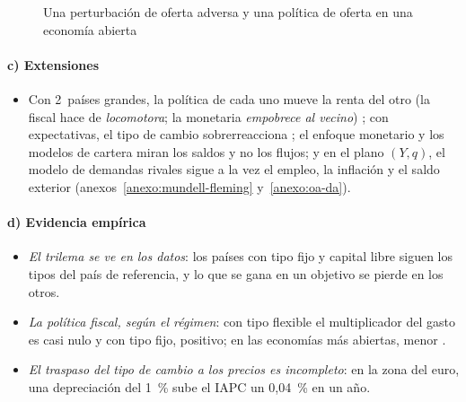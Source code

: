 \documentclass[11pt]{article}
\begin{document}
\begin{figure}[H]
\centering
\caption{Una perturbación de oferta adversa y una política de oferta en una economía abierta}\label{fig:oferta-abierta}
\end{figure}

\paragraph{c) Extensiones}

\begin{itemize}
\item Con 2~países grandes, la política de cada uno mueve la renta del otro (la fiscal hace de \emph{locomotora}; la monetaria \emph{empobrece al vecino}) ; con expectativas, el tipo de cambio sobrerreacciona\nocite{Dornbusch1976Expectations} ; el enfoque monetario y los modelos de cartera miran los saldos y no los flujos; y en el plano $(Y,q)$, el modelo de demandas rivales sigue a la vez el empleo, la inflación y el saldo exterior (anexos~\ref{anexo:mundell-fleming} y~\ref{anexo:oa-da}).
\end{itemize}

\paragraph{d) Evidencia empírica}

\begin{itemize}
\item \emph{El trilema se ve en los datos}: los países con tipo fijo y capital libre siguen los tipos del país de referencia\nocite{ObstfeldShambaughTaylor2005}, y lo que se gana en un objetivo se pierde en los otros\nocite{AizenmanChinnIto2008}.
\item \emph{La política fiscal, según el régimen}: con tipo flexible el multiplicador del gasto es casi nulo y con tipo fijo, positivo; en las economías más abiertas, menor\nocite{IlzetzkiMendozaVegh2013} .
\item \emph{El traspaso del tipo de cambio a los precios es incompleto}: en la zona del euro, una depreciación del 1~\% sube el IAPC un 0,04~\% en un año\nocite{OrtegaOsbat2020ERPT}.
\end{itemize}
\end{document}
